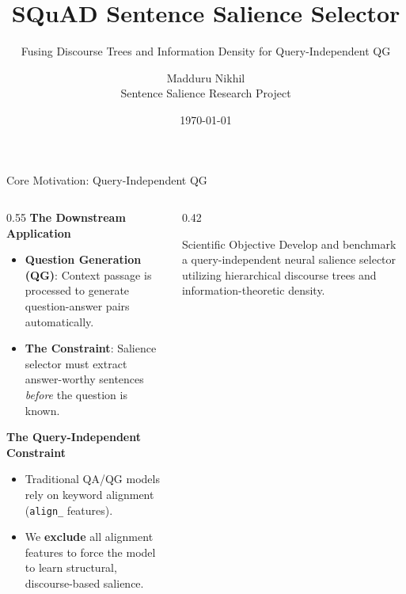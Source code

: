 \documentclass[aspectratio=169]{beamer}
\title[SQuAD Sentence Salience]{SQuAD Sentence Salience Selector}
\subtitle{Fusing Discourse Trees and Information Density for Query-Independent QG}
\author[Madduru Nikhil]{Madduru Nikhil \\ \vspace{0.1cm} \small Sentence Salience Research Project}
\date[July 2026]{\today}
\begin{document}
\begin{frame}[plain]
    \titlepage
\end{frame}

\begin{frame}{Core Motivation: Query-Independent QG}
    \begin{columns}
        \begin{column}{0.55\textwidth}
            \textbf{The Downstream Application}
            \begin{itemize}
                \item \textbf{Question Generation (QG)}: Context passage is processed to generate question-answer pairs automatically.
                \item \textbf{The Constraint}: Salience selector must extract answer-worthy sentences \textit{before} the question is known.
            \end{itemize}
            \vspace{0.2cm}
            \textbf{The Query-Independent Constraint}
            \begin{itemize}
                \item Traditional QA/QG models rely on keyword alignment (\texttt{align\_} features).
                \item We \textbf{exclude} all alignment features to force the model to learn structural, discourse-based salience.
            \end{itemize}
        \end{column}
        
        \begin{column}{0.42\textwidth}
            \begin{block}{Scientific Objective}
                Develop and benchmark a query-independent neural salience selector utilizing hierarchical discourse trees and information-theoretic density.
            \end{block}
        \end{column}
    \end{columns}
\end{frame}
\end{document}
